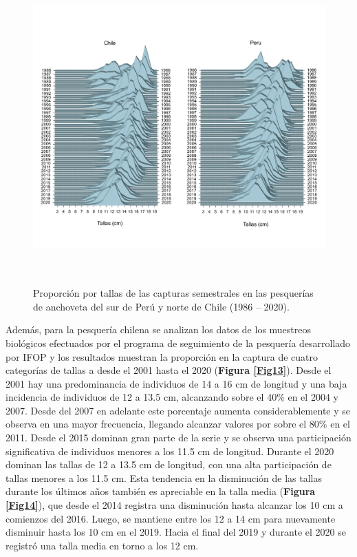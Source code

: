 \documentclass[letter,11pt]{article}
\begin{document}
\vspace{0.5cm}
\begin{figure}[htb!]
 \centering
 \includegraphics[width=19cm,height=12cm]{Figuras/figura12.pdf}
 \caption{Proporci\'on por tallas de las capturas semestrales en las pesquer\'ias de anchoveta del sur de Per\'u y norte de Chile (1986 – 2020).}
 \label{Fig12}
\end{figure}

Adem\'as, para la pesquer\'ia chilena se analizan los datos de los muestreos
biol\'ogicos efectuados por el programa de seguimiento de la pesquer\'ia
desarrollado por IFOP y los resultados muestran la proporci\'on en la
captura de cuatro categor\'ias de tallas a desde el 2001 hasta el 2020
(\textbf{Figura \ref{Fig13}}). Desde el 2001 hay una predominancia de
individuos de 14 a 16 cm de longitud y una baja incidencia de individuos
de 12 a 13.5 cm, alcanzando sobre el 40\% en el 2004 y 2007. Desde del
2007 en adelante este porcentaje aumenta considerablemente y se observa
en una mayor frecuencia, llegando alcanzar valores por sobre el 80\% en
el 2011. Desde el 2015 dominan gran parte de la serie y se observa una
participaci\'on significativa de individuos menores a los 11.5 cm de
longitud. Durante el 2020 dominan las tallas de 12 a 13.5 cm de
longitud, con una alta participaci\'on de tallas menores a los 11.5 cm.
Esta tendencia en la disminuci\'on de las tallas durante los \'ultimos a\~{n}os
tambi\'en es apreciable en la talla media (\textbf{Figura \ref{Fig14}}),
que desde el 2014 registra una disminuci\'on hasta alcanzar los 10 cm a
comienzos del 2016. Luego, se mantiene entre los 12 a 14 cm para
nuevamente disminuir hasta los 10 cm en el 2019. Hacia el final del 2019
y durante el 2020 se registr\'o una talla media en torno a los 12 cm.
\end{document}
